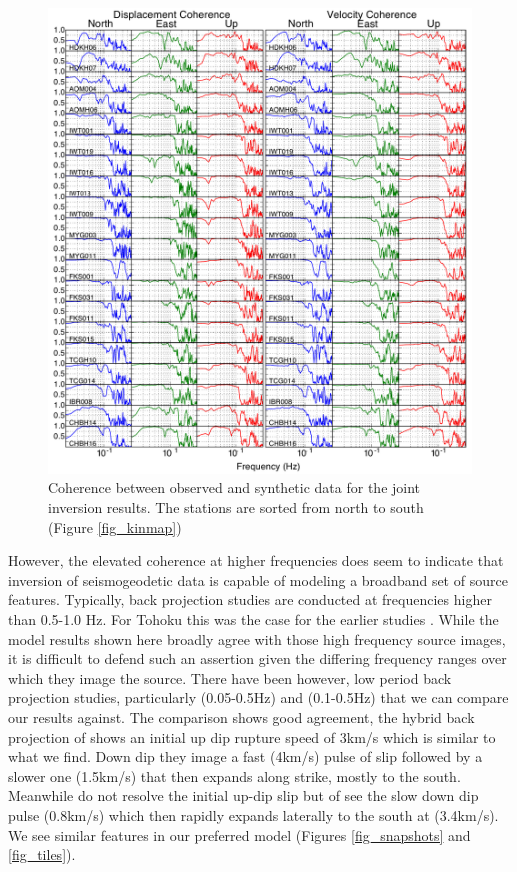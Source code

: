 \begin{figure}[!ht] 
  \centering
  \includegraphics[width=0.99\linewidth]{./figures/ch4/all_coherence.pdf}
    \caption[Coherence plots]{Coherence between observed and synthetic data for the joint inversion results. The stations are sorted from north to south (Figure \ref{fig_kinmap})}
  \label{fig_coherence}
\end{figure}

However, the elevated coherence at higher frequencies does seem to indicate that inversion of seismogeodetic data is capable of modeling a broadband set of source features. Typically, back projection studies are conducted at frequencies higher than 0.5-1.0 Hz. For Tohoku this was the case for the earlier studies \citep{wang2011bp,koper2011}. While the model results shown here broadly agree with those high frequency source images, it is difficult to defend such an assertion given the differing frequency ranges over which they image the source. There have been however, low period back projection studies, particularly \citet{kiser2012} (0.05-0.5Hz) and \citet{yagi2012} (0.1-0.5Hz) that we can compare our results against. The comparison shows good agreement, the hybrid back projection of \citet{yagi2012} shows an initial up dip rupture speed of 3km/s which is similar to what we find. Down dip they image a fast (4km/s) pulse of slip followed by a slower one (1.5km/s) that then expands along strike, mostly to the south. Meanwhile \citet{kiser2012} do not resolve the initial up-dip slip but of see the slow down dip pulse (0.8km/s) which then rapidly expands laterally to the south at (3.4km/s). We see similar features in our preferred model (Figures \ref{fig_snapshots} and \ref{fig_tiles}). 

